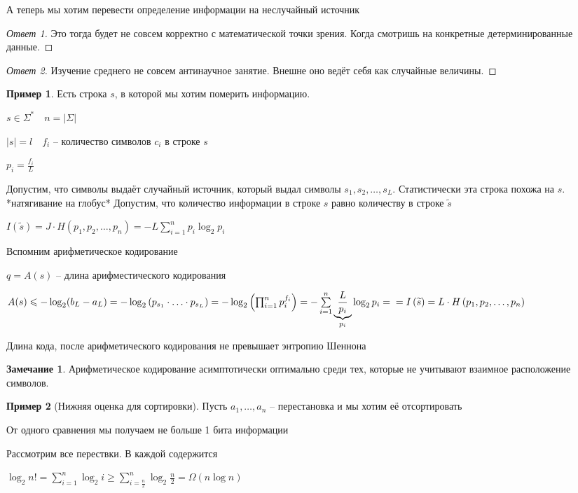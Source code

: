 \documentclass{book}
\newcommand{\tl}[1]{\widetilde{#1}}
\theoremstyle{definition}
\newtheorem*{note}{Замечание}
\newtheorem*{example}{Пример}
\begin{document}
     А теперь мы хотим перевести определение информации на неслучайный источник
     \begin{proof}
         [Ответ 1]
         Это тогда будет не совсем корректно с математической точки зрения. Когда смотришь на конкретные детерминированные данные.
     \end{proof}
     \begin{proof}
         [Ответ 2]
         Изучение среднего не совсем антинаучное занятие. Внешне оно ведёт себя как случайные величины.
     \end{proof}


\begin{example}
    Есть строка $s$, в которой мы хотим померить информацию.

     $s\in \Sigma^*\quad n = \left| \Sigma \right| $

     $|s| = l\quad f_i$ -- количество символов  $c_i$ в строке  $s$

      $p_i = \frac{f_i}{L}$ 

      Допустим, что символы выдаёт случайный источник, который выдал символы $s_1, s_2, \ldots , s_L$. Статистически эта строка похожа на $s$.  *натягивание на глобус* Допустим, что количество информации в строке $s$ равно количеству в строке  $\tl s$

      $I(\tl s) = J\cdot H\left( p_1, p_2, \ldots, p_n \right)  = -L \sum_{i=1}^{n} p_i \log_2p_i$
\end{example}

Вспомним арифметическое кодирование

$q=A(s)$ -- длина арифместического кодирования

$A(s)\leqslant -\log_2 (b_L-a_L) = -\log_2 \left( p_{s_1}\cdot \ldots\cdot p_{s_L} \right)  = -\log_2 \left( \prod_{i=1}^np_i^{f_i} \right) =-\sum_{i=1}^{n} \underbrace{\frac{L}{p_i}}\limits_{p_i}\log_2 p_i =\\= I\left( \tl s \right)  = L\cdot H\left( p_1, p_2, \ldots, p_n \right)   $

\begin{theorem}
    Длина кода, после арифметического кодирования не превышает энтропию Шеннона
\end{theorem}
\begin{note}
    Арифметическое кодирование асимптотически оптимально среди тех, которые не учитывают взаимное расположение символов.
\end{note}

\begin{example}
    [Нижняя оценка для сортировки]

    Пусть $a_1, \ldots, a_n$ -- перестановка и мы хотим её отсортировать

    \begin{statement}
        От одного сравнения мы получаем не больше 1 бита информации
    \end{statement}

    Рассмотрим все перествки. В каждой содержится 

    $\log_2 n! = \sum_{i=1}^{n} \log_2 i\geqslant \sum_{i=\frac{n}{2}}^{n} \log_2 \frac{n}{2} = \Omega\left( n\log n \right)  $
\end{example}
\end{document}
